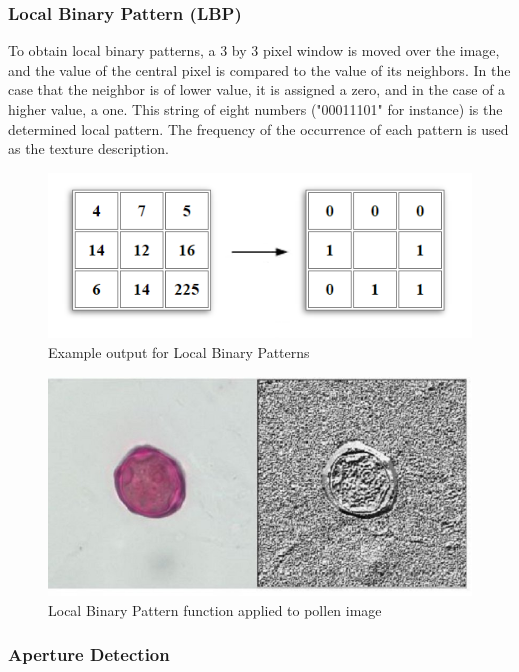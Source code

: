 \documentclass[runningheads,a4paper]{llncs}
\begin{document}
\subsubsection{Local Binary Pattern (LBP)}

To obtain local binary patterns, a 3 by 3 pixel window is moved over the image, and the value of the central pixel is compared to the value of its neighbors. In the case that the neighbor is of lower value, it is assigned a zero, and in the case of a higher value, a one. This string of eight numbers ("00011101" for instance) is the determined local pattern. The frequency of the occurrence of each pattern is used as the texture description. 
  
  

  
  
  
  
  
  
  

\begin{figure}[h!]
\begin{center}
\includegraphics[width=0.42\columnwidth]{figures/is/is.png}
\caption{\label{fig:lbp_grid}
Example output for Local Binary Patterns%
}
\end{center}
\end{figure}

\begin{figure}[h!]
\begin{center}
\includegraphics[width=0.7\columnwidth]{figures/comparer_lbp1/comparer_lbp1.jpg}
\caption{\label{fig:lbp_output}
Local Binary Pattern function applied to pollen image%
}
\end{center}
\end{figure}

\subsubsection{Aperture Detection}
\end{document}
